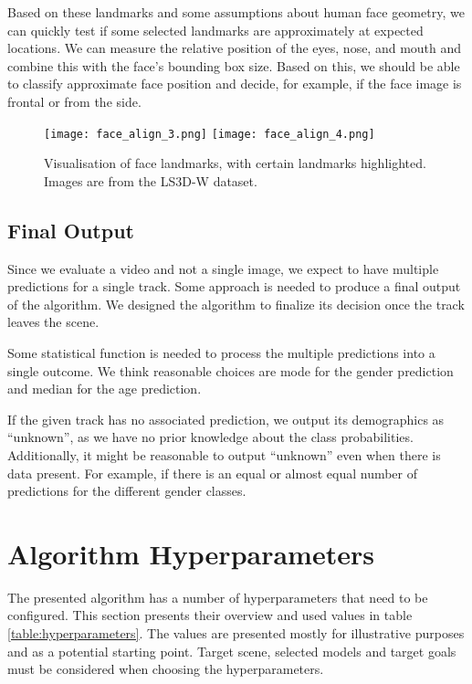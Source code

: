 Based on these landmarks and some assumptions about human face geometry, we can quickly test if some selected landmarks are approximately at expected locations. We can measure the relative position of the eyes, nose, and mouth and combine this with the face's bounding box size. Based on this, we should be able to classify approximate face position and decide, for example, if the face image is frontal or from the side.

\begin{figure}[htb]
    \centering
    \texttt{[image: face\_align\_3.png]}
    \texttt{[image: face\_align\_4.png]}
    \caption[Visualisation of face landmarks, with certain landmarks highlighted.]{Visualisation of face landmarks, with certain landmarks highlighted. Images are from the  LS3D-W dataset\cite{bulat2017far_face_alignment}.}
    \label{fig:face_landmark_features}
\end{figure}


\subsection{Final Output}

Since we evaluate a video and not a single image, we expect to have multiple predictions for a single track. Some approach is needed to produce a final output of the algorithm. We designed the algorithm to finalize its decision once the track leaves the scene.

Some statistical function is needed to process the multiple predictions into a single outcome. We think reasonable choices are mode for the gender prediction and median for the age prediction.

% 
If the given track has no associated prediction, we output its demographics as ``unknown'', as we have no prior knowledge about the class probabilities. Additionally, it might be reasonable to output ``unknown'' even when there is data present. For example, if there is an equal or almost equal number of predictions for the different gender classes.


\section{Algorithm Hyperparameters}

The presented algorithm has a number of hyperparameters that need to be configured. This section presents their overview and used values in table \ref{table:hyperparameters}. The values are presented mostly for illustrative purposes and as a potential starting point. Target scene, selected models and target goals must be considered when choosing the hyperparameters.

